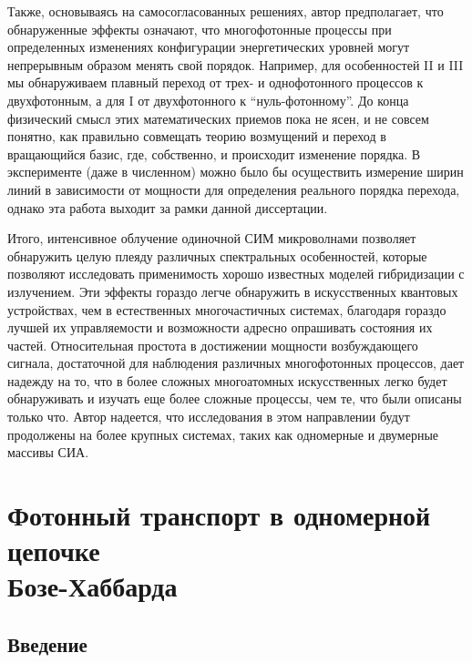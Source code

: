 \documentclass[14pt, a4paper]{extreport}
\numberwithin{equation}{section}
\begin{document}
Также, основываясь на самосогласованных решениях, автор предполагает, что обнаруженные эффекты означают, что многофотонные процессы при определенных изменениях конфигурации энергетических уровней могут непрерывным образом менять свой порядок. Например, для особенностей II и III мы обнаруживаем плавный переход от трех- и однофотонного процессов к двухфотонным, а для I от двухфотонного к ``нуль-фотонному''. До конца физический смысл этих математических приемов пока не ясен, и не совсем понятно, как правильно совмещать теорию возмущений и переход в вращающийся базис, где, собственно, и происходит изменение порядка. В эксперименте (даже в численном) можно было бы осуществить измерение ширин линий в зависимости от мощности для определения реального порядка перехода, однако эта работа выходит за рамки данной диссертации.

Итого, интенсивное облучение одиночной СИМ микроволнами позволяет обнаружить целую плеяду различных спектральных особенностей, которые позволяют исследовать применимость хорошо известных моделей гибридизации с излучением. Эти эффекты гораздо легче обнаружить в искусственных квантовых устройствах, чем в естественных многочастичных системах, благодаря гораздо лучшей их управляемости и возможности адресно опрашивать состояния их частей. Относительная простота в достижении мощности возбуждающего сигнала, достаточной для наблюдения различных многофотонных процессов, дает надежду на то, что в более сложных многоатомных искусственных легко будет обнаруживать и изучать еще более сложные процессы, чем те, что были описаны только что. Автор надеется, что исследования в этом направлении будут продолжены на более крупных системах, таких как одномерные и двумерные массивы СИА.

\chapter{Фотонный транспорт в одномерной цепочке\\ Бозе-Хаббарда}

\section{Введение}
\end{document}
